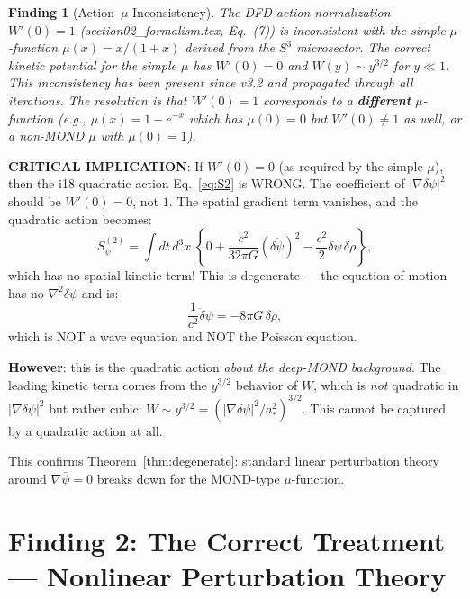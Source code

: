 \documentclass[11pt]{article}
\newtheorem{finding}{Finding}
\newcommand{\dpsi}{\delta\psi}
\newcommand{\astar}{a_*}
\begin{document}
\begin{finding}[Action--$\mu$ Inconsistency]
\label{find:inconsistency}
The DFD action normalization $W'(0) = 1$ (section02\_formalism.tex,
Eq.~(7)) is inconsistent with the simple $\mu$-function
$\mu(x) = x/(1+x)$ derived from the $S^3$ microsector. The correct
kinetic potential for the simple $\mu$ has $W'(0) = 0$ and
$W(y) \sim y^{3/2}$ for $y \ll 1$. This inconsistency has been
present since v3.2 and propagated through all iterations.
The resolution is that $W'(0) = 1$ corresponds to a
\textbf{different} $\mu$-function (e.g., $\mu(x) = 1 - e^{-x}$
which has $\mu(0) = 0$ but $W'(0) \neq 1$ as well, or a non-MOND
$\mu$ with $\mu(0) = 1$).
\end{finding}

\textbf{CRITICAL IMPLICATION}: If $W'(0) = 0$ (as required by the
simple $\mu$), then the i18 quadratic action Eq.~\eqref{eq:S2}
is WRONG. The coefficient of $|\nabla\dpsi|^2$ should be
$W'(0) = 0$, not $1$. The spatial gradient term vanishes, and the
quadratic action becomes:
\begin{equation}
S^{(2)}_\psi = \int dt\,d^3x\;\left\{
  0 + \frac{c^2}{32\pi G}(\delta\dot\psi)^2
  - \frac{c^2}{2}\dpsi\,\delta\rho
\right\},
\label{eq:S2-corrected}
\end{equation}
which has no spatial kinetic term! This is degenerate --- the equation
of motion has no $\nabla^2\dpsi$ and is:
\begin{equation}
\frac{1}{c^2}\ddot\dpsi = -8\pi G\,\delta\rho,
\end{equation}
which is NOT a wave equation and NOT the Poisson equation.

\textbf{However}: this is the quadratic action \emph{about the
deep-MOND background}. The leading kinetic term comes from the
$y^{3/2}$ behavior of $W$, which is \emph{not} quadratic in
$|\nabla\dpsi|^2$ but rather cubic: $W \sim y^{3/2}
= (|\nabla\dpsi|^2/\astar^2)^{3/2}$. This cannot be captured by
a quadratic action at all.

This confirms Theorem~\ref{thm:degenerate}: standard linear
perturbation theory around $\nabla\bar\psi = 0$ breaks down for the
MOND-type $\mu$-function.


\part{Finding 2: The Correct Treatment --- Nonlinear Perturbation Theory}
\label{part:resolution}
\end{document}
